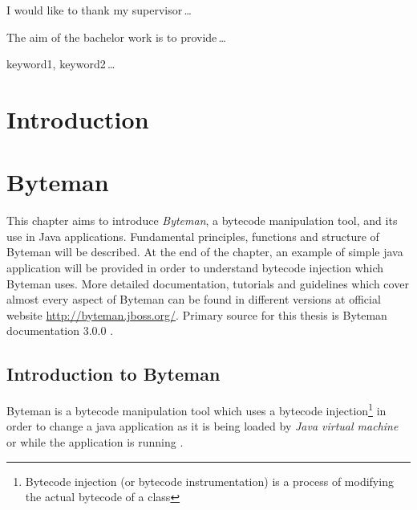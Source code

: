 \documentclass[12pt,oneside]{fithesis2}
\begin{document}
  \FrontMatter                    %
    \ThesisTitlePage                %
    \begin{ThesisDeclaration}       %
      \DeclarationText
      \AdvisorName
    \end{ThesisDeclaration}
    \begin{ThesisThanks}            %
      I would like to thank my supervisor\,\dots
    \end{ThesisThanks}
    \begin{ThesisAbstract}          %
      The aim of the bachelor work is to provide\,\dots
    \end{ThesisAbstract}
    \begin{ThesisKeyWords}          %
      keyword1, keyword2\,\dots
    \end{ThesisKeyWords}
    \tableofcontents                %
  
  \MainMatter                     %
    \chapter{Introduction}          %
\chapter{Byteman}
This chapter aims to introduce \textit{Byteman}, a bytecode manipulation tool, and its use in Java applications. Fundamental principles, functions and structure of Byteman will be described.
At the end of the chapter, an example of simple java application will be provided in order to understand bytecode injection which Byteman uses. More detailed documentation, tutorials and guidelines 
which cover almost every aspect of Byteman can be found in different versions at official website \url{http://byteman.jboss.org/}. Primary source for this thesis is Byteman documentation 3.0.0 \cite{byteman_doc}.

\section{Introduction to Byteman}
Byteman is a bytecode manipulation tool which uses a bytecode injection\footnote{Bytecode injection (or bytecode instrumentation) is a process of modifying the actual bytecode of a class} in order to change a java application as it is being loaded by \textit{Java virtual machine} or while the application is running \cite[Introduction to Byteman]{byteman_doc}.
\end{document}
